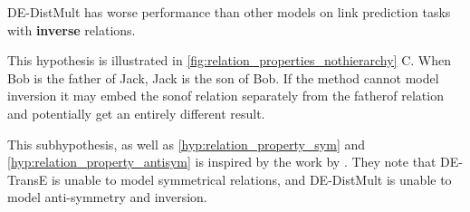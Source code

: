 \begin{subhypothesis}
\label{hyp:relation_property_inv}
DE-DistMult has worse performance than other models on link prediction tasks with \textbf{inverse} relations.
\end{subhypothesis}

This hypothesis is illustrated in \autoref{fig:relation_properties_nothierarchy} C. When Bob is the father of Jack, Jack is the son of Bob. If the method cannot model inversion it may embed the sonof relation separately from the fatherof relation and potentially get an entirely different result.

This subhypothesis, as well as \autoref{hyp:relation_property_sym} and \autoref{hyp:relation_property_antisym} is inspired by the work by \cite{goel19diachronicemb}. They note that DE-TransE is unable to model symmetrical relations, and DE-DistMult is unable to model anti-symmetry and inversion.






% 


